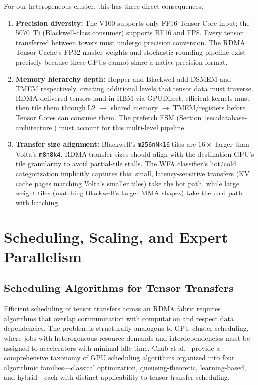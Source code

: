 \documentclass[11pt,letterpaper]{article}
\theoremstyle{definition}
\begin{document}
For our heterogeneous cluster, this has three direct consequences:
\begin{enumerate}
    \item \textbf{Precision diversity:} The V100 supports only FP16 Tensor Core input; the 5070~Ti (Blackwell-class consumer) supports BF16 and FP8. Every tensor transferred between towers must undergo precision conversion. The RDMA Tensor Cache's FP32 master weights and stochastic rounding pipeline exist precisely because these GPUs cannot share a native precision format.

    \item \textbf{Memory hierarchy depth:} Hopper and Blackwell add DSMEM and TMEM respectively, creating additional levels that tensor data must traverse. RDMA-delivered tensors land in HBM via GPUDirect; efficient kernels must then tile them through L2 $\to$ shared memory $\to$ TMEM/registers before Tensor Cores can consume them. The prefetch FSM (Section~\ref{sec:database-architecture}) must account for this multi-level pipeline.

    \item \textbf{Transfer size alignment:} Blackwell's \texttt{m256nNk16} tiles are $16\times$ larger than Volta's \texttt{m8n8k4}. RDMA transfer sizes should align with the destination GPU's tile granularity to avoid partial-tile stalls. The WFA classifier's hot/cold categorization implicitly captures this: small, latency-sensitive transfers (KV cache pages matching Volta's smaller tiles) take the hot path, while large weight tiles (matching Blackwell's larger MMA shapes) take the cold path with batching.
\end{enumerate}

\section{Scheduling, Scaling, and Expert Parallelism}
\label{sec:scheduling-scaling}

\subsection{Scheduling Algorithms for Tensor Transfers}
\label{sec:gpu-scheduling}

Efficient scheduling of tensor transfers across an RDMA fabric requires algorithms that overlap communication with computation and respect data dependencies. The problem is structurally analogous to GPU cluster scheduling, where jobs with heterogeneous resource demands and interdependencies must be assigned to accelerators with minimal idle time. Chab et al.~\cite{gpu-scheduling-survey} provide a comprehensive taxonomy of GPU scheduling algorithms organized into four algorithmic families---classical optimization, queueing-theoretic, learning-based, and hybrid---each with distinct applicability to tensor transfer scheduling.
\end{document}
